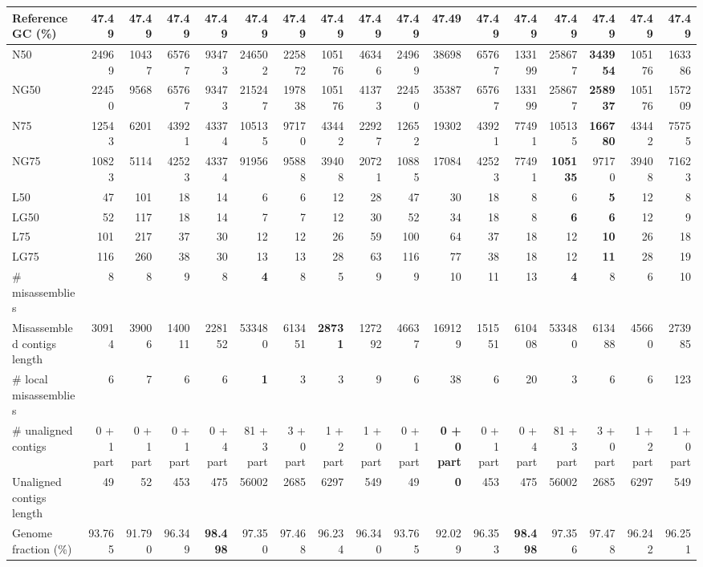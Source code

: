 \documentclass[12pt,a4paper]{article}
\begin{document}
\begin{table}[ht]
\begin{center}
\begin{tabular}{|l*{16}{|r}|}
Reference GC (\%) & 47.49 & 47.49 & 47.49 & 47.49 & 47.49 & 47.49 & 47.49 & 47.49 & 47.49 & 47.49 & 47.49 & 47.49 & 47.49 & 47.49 & 47.49 & 47.49 \\ \hline
N50 & 24969 & 10437 & 65767 & 93473 & 246502 & 225872 & 105176 & 46346 & 24969 & 38698 & 65767 & 133199 & 258677 & {\bf 343954} & 105176 & 163386 \\ \hline
NG50 & 22450 & 9568 & 65767 & 93473 & 215247 & 197838 & 105176 & 41373 & 22450 & 35387 & 65767 & 133199 & 258677 & {\bf 258937} & 105176 & 157209 \\ \hline
N75 & 12543 & 6201 & 43921 & 43374 & 105135 & 97170 & 43442 & 22927 & 12652 & 19302 & 43921 & 77491 & 105135 & {\bf 166780} & 43442 & 75755 \\ \hline
NG75 & 10823 & 5114 & 42523 & 43374 & 91956 & 95888 & 39408 & 20721 & 10885 & 17084 & 42523 & 77491 & {\bf 105135} & 97170 & 39408 & 71623 \\ \hline
L50 & 47 & 101 & 18 & 14 & 6 & 6 & 12 & 28 & 47 & 30 & 18 & 8 & 6 & {\bf 5} & 12 & 8 \\ \hline
LG50 & 52 & 117 & 18 & 14 & 7 & 7 & 12 & 30 & 52 & 34 & 18 & 8 & {\bf 6} & {\bf 6} & 12 & 9 \\ \hline
L75 & 101 & 217 & 37 & 30 & 12 & 12 & 26 & 59 & 100 & 64 & 37 & 18 & 12 & {\bf 10} & 26 & 18 \\ \hline
LG75 & 116 & 260 & 38 & 30 & 13 & 13 & 28 & 63 & 116 & 77 & 38 & 18 & 12 & {\bf 11} & 28 & 19 \\ \hline
\# misassemblies & 8 & 8 & 9 & 8 & {\bf 4} & 8 & 5 & 9 & 9 & 10 & 11 & 13 & {\bf 4} & 8 & 6 & 10 \\ \hline
Misassembled contigs length & 30914 & 39006 & 140011 & 228152 & 533480 & 613451 & {\bf 28731} & 127292 & 46637 & 169129 & 151551 & 610408 & 533480 & 613488 & 45660 & 273985 \\ \hline
\# local misassemblies & 6 & 7 & 6 & 6 & {\bf 1} & 3 & 3 & 9 & 6 & 38 & 6 & 20 & 3 & 6 & 6 & 123 \\ \hline
\# unaligned contigs & 0 + 1 part & 0 + 1 part & 0 + 1 part & 0 + 4 part & 81 + 3 part & 3 + 0 part & 1 + 2 part & 1 + 0 part & 0 + 1 part & {\bf 0 + 0 part} & 0 + 1 part & 0 + 4 part & 81 + 3 part & 3 + 0 part & 1 + 2 part & 1 + 0 part \\ \hline
Unaligned contigs length & 49 & 52 & 453 & 475 & 56002 & 2685 & 6297 & 549 & 49 & {\bf 0} & 453 & 475 & 56002 & 2685 & 6297 & 549 \\ \hline
Genome fraction (\%) & 93.765 & 91.790 & 96.349 & {\bf 98.498} & 97.350 & 97.468 & 96.234 & 96.340 & 93.765 & 92.029 & 96.353 & {\bf 98.498} & 97.356 & 97.478 & 96.242 & 96.251 \\ \hline

\end{tabular}
\end{center}
\end{table}
\end{document}
